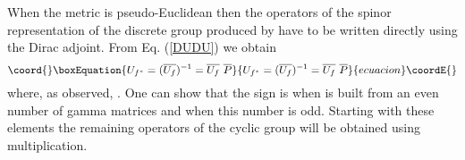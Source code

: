\documentclass[a4paper,12pt]{article}
\begin{document}
When the metric is pseudo-Euclidean then the operators of the spinor 
representation of the discrete group \coordHE{} produced by 
\coordHE{} have to be written directly using the Dirac adjoint. From 
Eq. (\ref{DUDU}) we obtain 
\begin{equation}\coord{}\boxEquation{
U_{f^*}=(\overline{U_f})^{-1}=\overline{U_f}\,\,\overline{P}
}{
U_{f^*}=(\overline{U_f})^{-1}=\overline{U_f}\,\,\overline{P}
}{ecuacion}\coordE{}\end{equation}
where, as observed, \coordHE{}. One can show that the sign is \myHighlight{$(+)$}\coordHE{}   
when \myHighlight{$\gamma$}\coordHE{} is built from an even number of gamma matrices and \myHighlight{$(-)$}\coordHE{} when 
this number is odd. Starting with these elements  the remaining operators of 
the cyclic group will be obtained using multiplication. 
\end{document}
